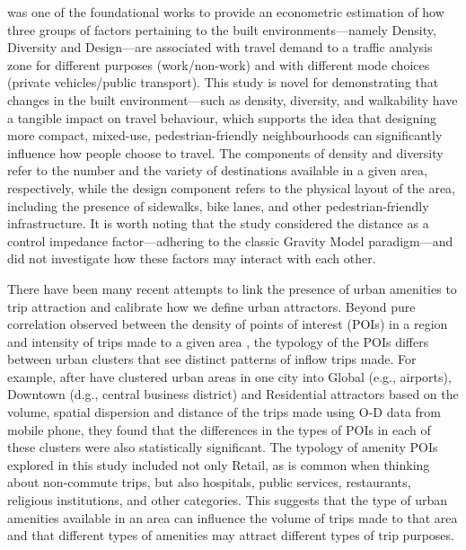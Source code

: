 \citet{cerveroTravelDemand3Ds1997} was one of the foundational works to provide an econometric estimation of how three groups of factors pertaining to the built environments---namely Density, Diversity and Design---are associated with travel demand to a traffic analysis zone for different purposes (work/non-work) and with different mode choices (private vehicles/public transport). This study is novel for demonstrating that changes in the built environment—such as density, diversity, and walkability have a tangible impact on travel behaviour, which supports the idea that designing more compact, mixed-use, pedestrian-friendly neighbourhoods can significantly influence how people choose to travel. The components of density and diversity refer to the number and the variety of destinations available in a given area, respectively, while the design component refers to the physical layout of the area, including the presence of sidewalks, bike lanes, and other pedestrian-friendly infrastructure. It is worth noting that the study considered the distance as a control impedance factor---adhering to the classic Gravity Model paradigm---and did not investigate how these factors may interact with each other.

There have been many recent attempts to link the presence of urban amenities to trip attraction and calibrate how we define urban attractors. Beyond pure correlation observed between the density of points of interest (POIs) in a region and intensity of trips made to a given area \citep{melikovCharacterizingUrbanMobility2021}, the typology of the POIs differs between urban clusters that see distinct patterns of inflow trips made. For example, after \citet{aaqibjavedEstimationTripAttraction2020} have clustered urban areas in one city into Global (e.g., airports), Downtown (d.g., central business district) and Residential attractors based on the volume, spatial dispersion and distance of the trips made using O-D data from mobile phone, they found that the differences in the types of POIs in each of these clusters were also statistically significant. The typology of amenity POIs explored in this study included not only Retail, as is common when thinking about non-commute trips, but also hospitals, public services, restaurants, religious institutions, and other categories. This suggests that the type of urban amenities available in an area can influence the volume of trips made to that area and that different types of amenities may attract different types of trip purposes.

